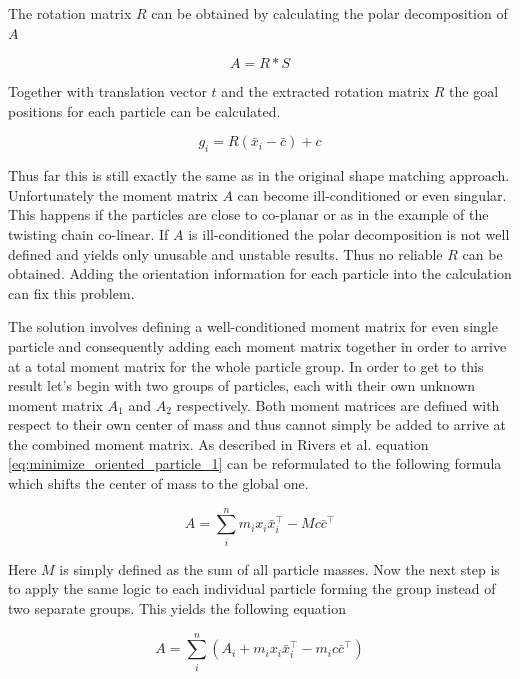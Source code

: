The rotation matrix $R$ can be obtained by calculating the polar decomposition of $A$

\begin{equation}
A = R*S
\end{equation}

Together with translation vector $t$ and the extracted rotation matrix $R$ the goal positions for each particle can be calculated.

\begin{equation}
g_i = R(\bar{x}_i-\bar{c})+c
\end{equation}

Thus far this is still exactly the same as in the original shape matching approach. Unfortunately  the moment matrix $A$ can become ill-conditioned or even singular. This happens if the particles are close to co-planar or as in the example of the twisting chain co-linear. If $A$ is ill-conditioned the polar decomposition is not well defined and yields only unusable and unstable results. Thus no reliable $R$ can be obtained. Adding the orientation information for each particle into the calculation can fix this problem.

The solution involves defining a well-conditioned moment matrix for even single particle and consequently adding each moment matrix together in order to arrive at a total moment matrix for the whole particle group. In order to get to this result let's begin with two groups of particles, each with their own unknown moment matrix $A_1$ and $A_2$ respectively. Both moment matrices are defined with respect to their own center of mass and thus cannot simply be added to arrive at the combined moment matrix. As described in Rivers et al. \cite{Rivers:2007te} equation \ref{eq:minimize_oriented_particle_1} can be reformulated to the following formula which shifts the center of mass to the global one.

\begin{equation}
A = \sum\limits_i^n m_ix_i\bar{x}_i^\top - Mc\bar{c}^\top
\label{eq:minimize_oriented_particle_2}
\end{equation}

Here $M$ is simply defined as the sum of all particle masses. Now the next step is to apply the same logic to each individual particle forming the group instead of two separate groups. This yields the following equation

\begin{equation}
A = \sum\limits_i^n (A_i + m_ix_i\bar{x}_i^\top-m_ic\bar{c}^\top)
\end{equation}

